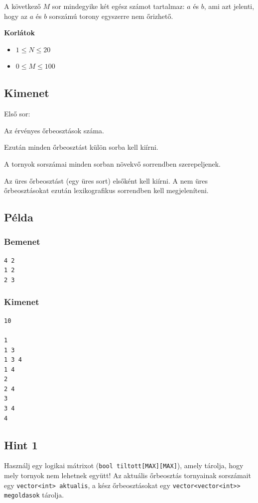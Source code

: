 \documentclass[12pt,a4paper]{article}
\begin{document}
A következő $M$ sor mindegyike két egész számot tartalmaz: $a$ és $b$, ami azt jelenti, hogy az $a$ és $b$ sorszámú torony egyszerre nem őrizhető.

\textbf{Korlátok}

\begin{itemize}
    \item $1 \le N \le 20$
    \item $0 \le M \le 100$
\end{itemize}

\subsection*{Kimenet}

Első sor:

Az érvényes őrbeosztások száma.

Ezután minden őrbeosztást külön sorba kell kiírni.

A tornyok sorszámai minden sorban növekvő sorrendben szerepeljenek.

Az üres őrbeosztást (egy üres sort) elsőként kell kiírni. A nem üres őrbeosztásokat ezután lexikografikus sorrendben kell megjeleníteni.

\subsection*{Példa}

\subsubsection*{Bemenet}

\begin{verbatim}
4 2
1 2
2 3
\end{verbatim}

\subsubsection*{Kimenet}

\begin{verbatim}
10

1
1 3
1 3 4
1 4
2
2 4
3
3 4
4
\end{verbatim}

\subsection*{Hint 1}
Használj egy logikai mátrixot (\texttt{bool tiltott[MAX][MAX]}), amely tárolja, hogy mely tornyok nem lehetnek együtt! Az aktuális őrbeosztás tornyainak sorszámait egy \texttt{vector<int> aktualis}, a kész őrbeosztásokat egy \texttt{vector<vector<int>> megoldasok} tárolja.
\end{document}
